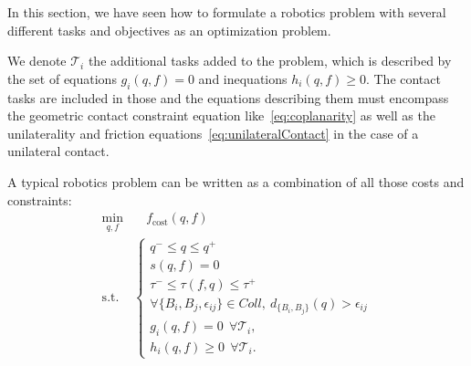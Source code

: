 In this section, we have seen how to formulate a robotics problem with several different tasks and objectives as an optimization problem.

We denote $\mathcal{T}_i$ the additional tasks added to the problem, which is described by the set of equations $g_i(q,f) = 0$ and inequations $h_i(q,f) \geq 0$.
The contact tasks are included in those and the equations describing them must encompass the geometric contact constraint equation like~\ref{eq:coplanarity} as well as the unilaterality and friction equations~\ref{eq:unilateralContact} in the case of a unilateral contact.

A typical robotics problem can be written as a combination of all those costs and constraints:
\begin{align}
\min_{q, f} & \quad f_\text{cost}(q,f) \nonumber\\
\text{s.t.}&
\left\{
\begin{array}{lr}
q^- \le q \le q^+\\
s(q,f) = 0 \\
\tau^- \le \tau(f,q) \le \tau^+\\
\forall \{B_i, B_j, \epsilon_{ij}\} \in Coll,\ d_{\{B_i, B_j\}}(q) > \epsilon_{ij}\\
g_i(q,f) = 0\ \ \forall\mathcal{T}_i,\\
h_i(q,f) \geq 0\ \ \forall\mathcal{T}_i.
\end{array}\right.
\label{eq:PG}
\end{align}




